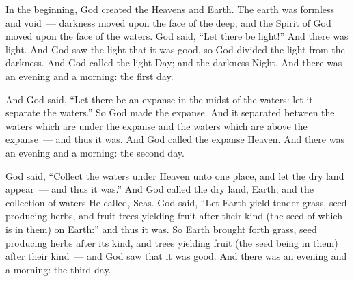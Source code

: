 
\begin{inparaenum}
   In the beginning, God created the Heavens and Earth.%
   The earth was formless and void~--- darkness moved upon the face of the deep, and the Spirit of God moved upon the face of the waters.%
   God said, ``Let there be light!'' And there was light.%
   And God saw the light that it was good, so God divided the light from the darkness.%
   And God called the light Day; and the darkness Night. And there was an evening and a morning: the first day.%

   And God said, ``Let there be an expanse in the midst of the waters: let it separate the waters.''%
   So God made the expanse. And it separated between the waters which are under the expanse and the waters which are above the expanse~--- and thus it was.%
   And God called the expanse Heaven. And there was an evening and a morning: the second day.%

   God said, ``Collect the waters under Heaven unto one place, and let the dry land appear~--- and thus it was.''%
   And God called the dry land, Earth; and the collection of waters He called, Seas.%
   God said, ``Let Earth yield tender grass, seed producing herbs, and fruit trees yielding fruit after their kind (the seed of which is in them) on Earth:'' and thus it was.%
   So Earth brought forth grass, seed producing herbs after its kind, and trees yielding fruit (the seed being in them) after their kind~--- and God saw that it was good.%
   And there was an evening and a morning: the third day.%


\end{inparaenum}
